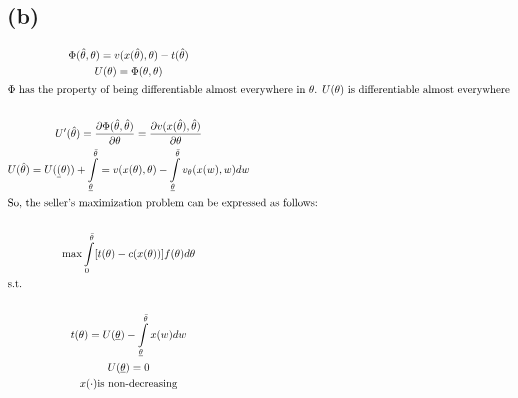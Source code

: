 \documentclass[10pt,a4paper]{article}
\begin{document}
  \subsection*{(b)}
    \begin{gather*}
      \Phi(\hat{\theta},\theta) = v(x(\hat{\theta}),\theta) - t(\hat{\theta}) \\
      U(\theta) = \Phi(\theta,\theta) \\
      \shortintertext{$\Phi$ has the property of being differentiable almost everywhere in $\theta$. $U(\theta)$ is differentiable almost everywhere} \\
      U'(\hat{\theta}) = \frac{\partial \Phi(\hat{\theta},\hat{\theta})}{\partial\theta} = \frac{\partial v(x(\hat{\theta}),\hat{\theta})}{\partial\theta} \\
      U(\hat{\theta}) = U(\underline(\theta)) + \int\limits_{\underline{\theta}}^{\bar{\theta}} = v(x(\theta),\theta) - 
      \int\limits_{\underline{\theta}}^{\bar{\theta}}v_{\theta}(x(w),w)dw \\
      \shortintertext{So, the seller's maximization problem can be 
      expressed as follows:} \\
      \max\int\limits_0^{\bar{\theta}}[t(\theta) - 
      c(x(\theta))]f(\theta)d\theta \\
      \shortintertext{s.t.} \\
      t(\theta) = U(\underline{\theta}) - 
      \int\limits_{\underline{\theta}}^{\bar{\theta}}x(w)dw \\
      U(\underline{\theta}) = 0 \\
      x(\cdot) \text{is non-decreasing}
    \end{gather*}
\end{document}
